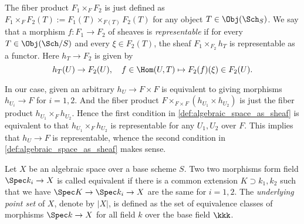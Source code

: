     \begin{remark}
        The fiber product \(F_1 \times_F F_2\) is just defined as \(F_1 \times_F F_2(T) := F_1(T) \times_{F(T)} F_2(T)\) for any object \(T \in \Obj(\Sch_S)\).
        We say that a morphism \(f: F_1 \to F_2\) of sheaves is \emph{representable} if for every \(T \in \Obj(\Sch/S)\) and every \(\xi \in F_2(T)\), the sheaf \(F_1 \times_{F_2} h_T\) is representable as a functor.
        Here \(h_T \to F_2\) is given by 
        \[ h_T(U) \to F_2(U), \quad f \in \Hom(U,T) \mapsto F_2(f)(\xi) \in F_2(U). \]

        In our case, given an arbitrary \(h_U \to F \times F\) is equivalent to giving morphisms \(h_{U_i} \to F\) for \(i=1,2\).
        And the fiber product \(F \times_{F \times F} (h_{U_1} \times h_{U_2})\) is just the fiber product \(h_{U_1} \times_{F} h_{U_2}\).
        Hence the first condition in \cref{def:algebraic_space_as_sheaf} is equivalent to that \(h_{U_1} \times_F h_{U_2}\) is representable for any \(U_1,U_2\) over \(F\).
        This implies that \(h_U \to F\) is representable, whence the second condition in \cref{def:algebraic_space_as_sheaf} makes sense.
    \end{remark}






    \begin{definition}\label{def:underlying_set_of_algebraic_space}
        Let \(X\) be an algebraic space over a base scheme \(S\).
        Two two morphisms form field \(\Spec k_i \to X\) is called equivalent if there is a common extension \(K \supset k_1,k_2\) such that we have \(\Spec K \to \Spec k_i \to X\) are the same for \(i=1,2\).
        The \emph{underlying point set} of \(X\), denote by \(|X|\), is defined as the set of equivalence classes of morphisms \(\Spec k \to X\) for all field \(k\) over the base field \(\kkk\).
    \end{definition}

